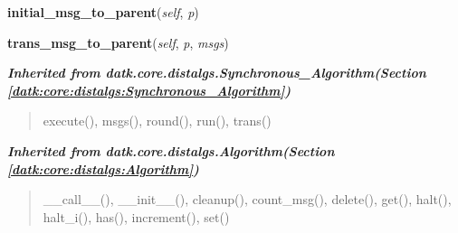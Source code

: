     \vspace{0.5ex}

\hspace{.8\funcindent}\begin{boxedminipage}{\funcwidth}

    \raggedright \textbf{initial\_msg\_to\_parent}(\textit{self}, \textit{p})

\setlength{\parskip}{2ex}
\setlength{\parskip}{1ex}
    \end{boxedminipage}

    \label{datk:core:algs:SynchConvergecast:trans_msg_to_parent}

    \vspace{0.5ex}

\hspace{.8\funcindent}\begin{boxedminipage}{\funcwidth}

    \raggedright \textbf{trans\_msg\_to\_parent}(\textit{self}, \textit{p}, \textit{msgs})

\setlength{\parskip}{2ex}
\setlength{\parskip}{1ex}
    \end{boxedminipage}


\large{\textbf{\textit{Inherited from datk.core.distalgs.Synchronous\_Algorithm\textit{(Section \ref{datk:core:distalgs:Synchronous_Algorithm})}}}}

\begin{quote}
execute(), msgs(), round(), run(), trans()
\end{quote}

\large{\textbf{\textit{Inherited from datk.core.distalgs.Algorithm\textit{(Section \ref{datk:core:distalgs:Algorithm})}}}}

\begin{quote}
\_\_call\_\_(), \_\_init\_\_(), cleanup(), count\_msg(), delete(), get(), halt(), halt\_i(), has(), increment(), set()
\end{quote}



